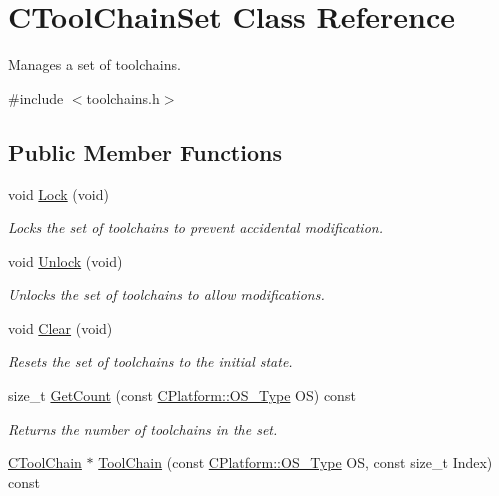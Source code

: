 \hypertarget{classCToolChainSet}{\section{C\-Tool\-Chain\-Set Class Reference}
\label{classCToolChainSet}
}


Manages a set of toolchains.  




{\ttfamily \#include $<$toolchains.\-h$>$}

\subsection*{Public Member Functions}
\begin{DoxyCompactItemize}
\item 
void \hyperlink{classCToolChainSet_a6f7c3e3755a389cc7ecb326bec26e399}{Lock} (void)
\begin{DoxyCompactList}\small\item\em Locks the set of toolchains to prevent accidental modification. \end{DoxyCompactList}\item 
void \hyperlink{classCToolChainSet_a09cd759de5503ee0e4f46eb72de0a146}{Unlock} (void)
\begin{DoxyCompactList}\small\item\em Unlocks the set of toolchains to allow modifications. \end{DoxyCompactList}\item 
void \hyperlink{classCToolChainSet_a6b563d9417242d5454248a0b502ab4cd}{Clear} (void)
\begin{DoxyCompactList}\small\item\em Resets the set of toolchains to the initial state. \end{DoxyCompactList}\item 
size\-\_\-t \hyperlink{classCToolChainSet_a0afacb67fa8806056ba02f2ea6eefe75}{Get\-Count} (const \hyperlink{classCPlatform_a2fb735c63c53052f79629e338bb0f535}{C\-Platform\-::\-O\-S\-\_\-\-Type} O\-S) const 
\begin{DoxyCompactList}\small\item\em Returns the number of toolchains in the set. \end{DoxyCompactList}\item 
\hyperlink{classCToolChain}{C\-Tool\-Chain} $\ast$ \hyperlink{classCToolChainSet_a640500708520ede89a7b28495181e9b6}{Tool\-Chain} (const \hyperlink{classCPlatform_a2fb735c63c53052f79629e338bb0f535}{C\-Platform\-::\-O\-S\-\_\-\-Type} O\-S, const size\-\_\-t Index) const 

\end{DoxyCompactItemize}
